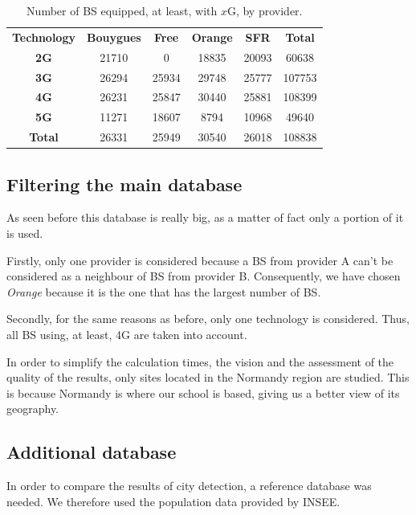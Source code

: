 \documentclass[lettersize,journal,english]{IEEEtran}
\begin{document}
        \begin{table}
            \centering
            \caption{Number of BS equipped, at least, with $x$G, by provider.}
            \label{table:techno_numbers}
            \begin{tabular}{cccccc}
                \toprule
                \textbf{Technology} & \textbf{Bouygues} & \textbf{Free} & \textbf{Orange} & \textbf{SFR} & \textbf{Total} \\
                \cmidrule(lr){1-6}
                \textbf{2G} & 21710 & 0 & 18835 & 20093 & 60638 \\
                \textbf{3G} & 26294 & 25934 & 29748 & 25777 & 107753 \\
                \textbf{4G} & 26231 & 25847 & 30440 & 25881 & 108399 \\
                \textbf{5G} & 11271 & 18607 & 8794 & 10968 & 49640 \\
                \textbf{Total} & 26331 & 25949 & 30540 & 26018 & 108838 \\
                \bottomrule
            \end{tabular}
        \end{table}

    \subsection{Filtering the main database}
        As seen before this database is really big, as a matter of fact only a portion of it is used.

        Firstly, only one provider is considered because a BS from provider A can't be considered as a neighbour of BS from provider B.
        Consequently, we have chosen \emph{Orange} because it is the one that has the largest number of BS.

        Secondly, for the same reasons as before, only one technology is considered. Thus, all BS using, at least, 4G are taken into account.

        In order to simplify the calculation times, the vision and the assessment of the quality of the results, only sites located in the Normandy region are studied.
        This is because Normandy is where our school is based, giving us a better view of its geography.

    \subsection{Additional database}
        In order to compare the results of city detection, a reference database was needed. We therefore used the population data provided by INSEE.
\end{document}
